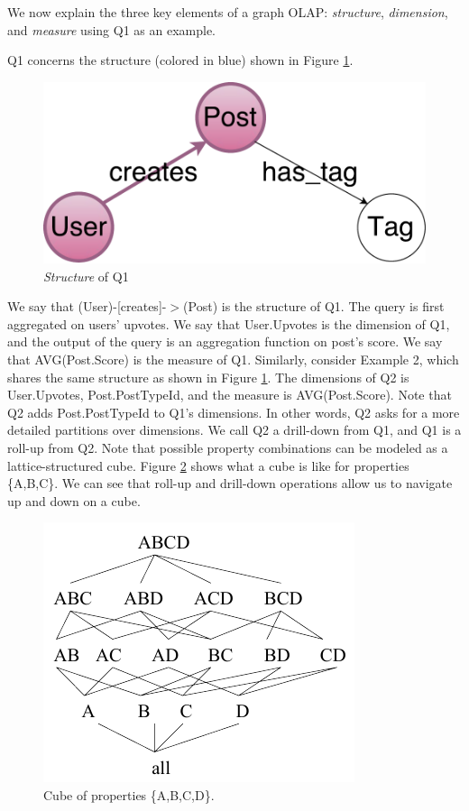 We now explain the three key elements of a graph OLAP: \textit{structure}, \textit{dimension}, and \textit{measure}  using Q1 as an example.


Q1 concerns the structure (colored in blue) shown in Figure \ref{fig:2:1}.

\begin{figure}[H]
	\centering
	\includegraphics[scale=0.35]{pic/meta1.pdf}
	\caption{\textit{Structure} of Q1}
	\label{fig:2:1}
\end{figure}



We say that (User)-[creates]-$>$(Post) is the structure of Q1. The query is first aggregated on users' upvotes. We say that {User.Upvotes} is the dimension of Q1, and the output of the query is an aggregation function on post’s score.  We say that {AVG(Post.Score)} is the measure of Q1. Similarly, consider Example 2, which shares the same structure as shown in Figure \ref{fig:2:1}. The dimensions of Q2 is {User.Upvotes, Post.PostTypeId}, and the measure is {AVG(Post.Score)}. Note that Q2 adds Post.PostTypeId to Q1's dimensions. In other words, Q2 asks for a more detailed partitions over dimensions. We call Q2 a drill-down from Q1, and  Q1 is a roll-up from Q2. Note that possible property combinations can be modeled as a lattice-structured cube. Figure \ref{fig:2:2} shows what a cube is like for properties \{A,B,C\}. We can see that roll-up and drill-down operations allow us to navigate up and down on a cube.


\begin{figure}[H]
	\centering
	\includegraphics[scale=1]{pic/22.pdf}
	\caption{Cube of properties \{A,B,C,D\}.}
	\label{fig:2:2}
\end{figure}

